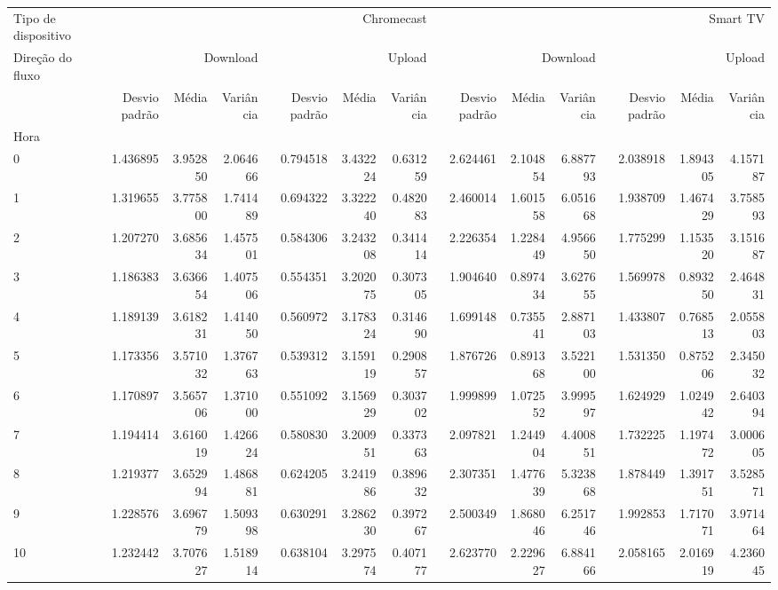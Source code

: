 \begin{tabular}{lrrrrrrrrrrrr}
\toprule
Tipo de dispositivo & \multicolumn{6}{r}{Chromecast} & \multicolumn{6}{r}{Smart TV} \\
Direção do fluxo & \multicolumn{3}{r}{Download} & \multicolumn{3}{r}{Upload} & \multicolumn{3}{r}{Download} & \multicolumn{3}{r}{Upload} \\
 & Desvio padrão & Média & Variância & Desvio padrão & Média & Variância & Desvio padrão & Média & Variância & Desvio padrão & Média & Variância \\
Hora &  &  &  &  &  &  &  &  &  &  &  &  \\
\midrule
0 & 1.436895 & 3.952850 & 2.064666 & 0.794518 & 3.432224 & 0.631259 & 2.624461 & 2.104854 & 6.887793 & 2.038918 & 1.894305 & 4.157187 \\
1 & 1.319655 & 3.775800 & 1.741489 & 0.694322 & 3.322240 & 0.482083 & 2.460014 & 1.601558 & 6.051668 & 1.938709 & 1.467429 & 3.758593 \\
2 & 1.207270 & 3.685634 & 1.457501 & 0.584306 & 3.243208 & 0.341414 & 2.226354 & 1.228449 & 4.956650 & 1.775299 & 1.153520 & 3.151687 \\
3 & 1.186383 & 3.636654 & 1.407506 & 0.554351 & 3.202075 & 0.307305 & 1.904640 & 0.897434 & 3.627655 & 1.569978 & 0.893250 & 2.464831 \\
4 & 1.189139 & 3.618231 & 1.414050 & 0.560972 & 3.178324 & 0.314690 & 1.699148 & 0.735541 & 2.887103 & 1.433807 & 0.768513 & 2.055803 \\
5 & 1.173356 & 3.571032 & 1.376763 & 0.539312 & 3.159119 & 0.290857 & 1.876726 & 0.891368 & 3.522100 & 1.531350 & 0.875206 & 2.345032 \\
6 & 1.170897 & 3.565706 & 1.371000 & 0.551092 & 3.156929 & 0.303702 & 1.999899 & 1.072552 & 3.999597 & 1.624929 & 1.024942 & 2.640394 \\
7 & 1.194414 & 3.616019 & 1.426624 & 0.580830 & 3.200951 & 0.337363 & 2.097821 & 1.244904 & 4.400851 & 1.732225 & 1.197472 & 3.000605 \\
8 & 1.219377 & 3.652994 & 1.486881 & 0.624205 & 3.241986 & 0.389632 & 2.307351 & 1.477639 & 5.323868 & 1.878449 & 1.391751 & 3.528571 \\
9 & 1.228576 & 3.696779 & 1.509398 & 0.630291 & 3.286230 & 0.397267 & 2.500349 & 1.868046 & 6.251746 & 1.992853 & 1.717071 & 3.971464 \\
10 & 1.232442 & 3.707627 & 1.518914 & 0.638104 & 3.297574 & 0.407177 & 2.623770 & 2.229627 & 6.884166 & 2.058165 & 2.016919 & 4.236045 \\

\end{tabular}
